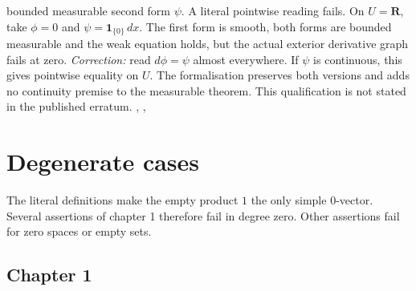 \documentclass[11pt]{article}
\newcommand{\R}{\mathbf R}
\newenvironment{errors}{%
  \par\begingroup
  \def\entrysecondlabel{Printed passage}%
  \def\entrythirdlabel{Correction and evidence}%
}{\par\endgroup}
\begin{document}
\begin{errors}
{bounded measurable second form $\psi$.}
{A literal pointwise reading fails. On $U=\R$, take $\phi=0$ and
$\psi=\mathbf1_{\{0\}}\,dx$. The first form is smooth, both forms are
bounded measurable and the weak equation holds, but the actual exterior
derivative graph fails at zero. \emph{Correction:} read $d\phi=\psi$
almost everywhere. If $\psi$ is continuous, this gives pointwise equality
on $U$. The formalisation preserves both versions and adds no continuity
premise to the measurable theorem. This qualification is not stated in
the published erratum.\newline
{},
,
}
\end{errors}

\section{Degenerate cases}\label{s:degenerate}
\noindent The literal definitions make the empty product $1$ the only simple
$0$-vector. Several assertions of chapter 1 therefore fail in degree zero.
Other assertions fail for zero spaces or empty sets.
\subsection{Chapter 1}
\end{document}
